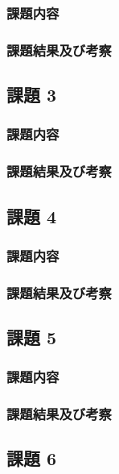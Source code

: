 \subsubsection{課題内容}

\subsubsection{課題結果及び考察}


\subsection{課題 3}


\subsubsection{課題内容}

\subsubsection{課題結果及び考察}


\subsection{課題 4}


\subsubsection{課題内容}

\subsubsection{課題結果及び考察}


\subsection{課題 5}


\subsubsection{課題内容}

\subsubsection{課題結果及び考察}


\subsection{課題 6}


